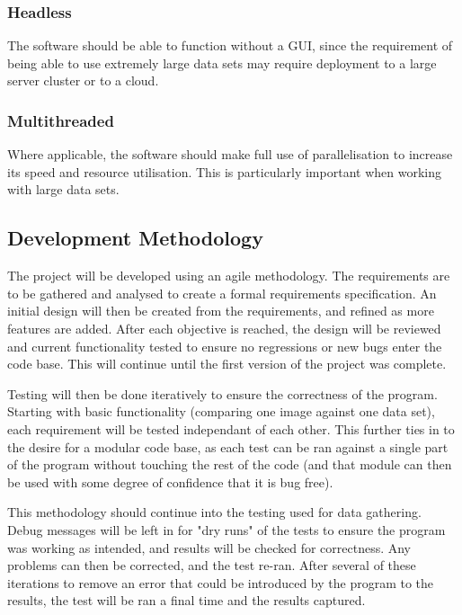 \documentclass[12pt]{article}
\begin{document}
\subsubsection{Headless}
The software should be able to function without a GUI, since the requirement of being able to use extremely large data sets may require deployment to a large server cluster or to a cloud.

\subsubsection{Multithreaded}
Where applicable, the software should make full use of parallelisation to increase its speed and resource utilisation. This is particularly important when working with large data sets.

\subsection{Development Methodology}
The project will be developed using an agile methodology. The requirements are to be gathered and analysed to create a formal requirements specification. An initial design will then be created from the requirements, and refined as more features are added. After each objective is reached, the design will be reviewed and current functionality tested to ensure no regressions or new bugs enter the code base. This will continue until the first version of the project was complete.

Testing will then be done iteratively to ensure the correctness of the program. Starting with basic functionality (comparing one image against one data set), each requirement will be tested independant of each other. This further ties in to the desire for a modular code base, as each test can be ran against a single part of the program without touching the rest of the code (and that module can then be used with some degree of confidence that it is bug free).

This methodology should continue into the testing used for data gathering. Debug messages will be left in for "dry runs" of the tests to ensure the program was working as intended, and results will be checked for correctness. Any problems can then be corrected, and the test re-ran. After several of these iterations to remove an error that could be introduced by the program to the results, the test will be ran a final time and the results captured.
\end{document}
